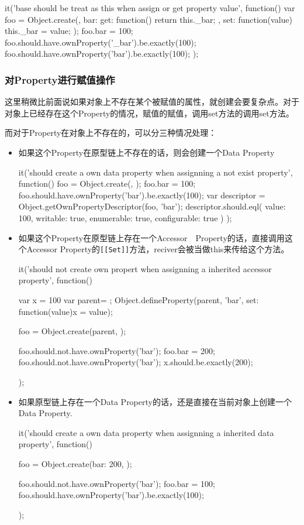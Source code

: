 \begin{JavaScript}
		it('base should be treat as this when assign or get property value', function(){
			var foo = Object.create({}, {
				bar: {get: function(){
					return this._bar;
				}, 
				set: function(value){
					this._bar = value;
				}}
			});
			foo.bar = 100;
			foo.should.have.ownProperty('_bar').be.exactly(100);
			foo.should.have.ownProperty('bar').be.exactly(100);
		});
\end{JavaScript}

\subsubsection{对Property进行赋值操作}
这里稍微比前面说如果对象上不存在某个被赋值的属性，就创建会要复杂点。对于对象上已经存在这个Property的情况，赋值的赋值，调用set方法的调用set方法。

而对于Property在对象上不存在的，可以分三种情况处理：
\begin{itemize}
\item 如果这个Property在原型链上不存在的话，则会创建一个Data Property
\begin{JavaScript}[Property在原型链上也不存在的话]
		it('should create a own data property when assignning a not exist property', function() {
			foo = Object.create({}, {});
			foo.bar = 100;
			foo.should.have.ownProperty('bar').be.exactly(100);
			var descriptor = Object.getOwnPropertyDescriptor(foo, 'bar');
			descriptor.should.eql({
				value: 100,
				writable: true,
				enumerable: true,
				configurable: true
			})
		});
\end{JavaScript}
\item 如果这个Property在原型链上存在一个Accessor　Property的话，直接调用这个Accessor Property的\lstinline![[Set]]!方法，reciver会被当做this来传给这个方法。
\begin{JavaScript}
		it('should not create own propert when assignning a inherited accessor property', function(){
			var x = 100
			var parent= {};
			Object.defineProperty(parent, 'bar', {set: function(value){x = value}});

			foo = Object.create(parent, {});

			foo.should.not.have.ownProperty('bar');
			foo.bar = 200;
			foo.should.not.have.ownProperty('bar');
			x.should.be.exactly(200);
		});
\end{JavaScript}

\item 如果原型链上存在一个Data Property的话，还是直接在当前对象上创建一个Data Property.
\begin{JavaScript}
		it('should create a own data property when assignning a inherited data property', function(){
			foo = Object.create({bar: 200}, {});

			foo.should.not.have.ownProperty('bar');
			foo.bar = 100;
			foo.should.have.ownProperty('bar').be.exactly(100);
		});
\end{JavaScript}
\end{itemize}
	
